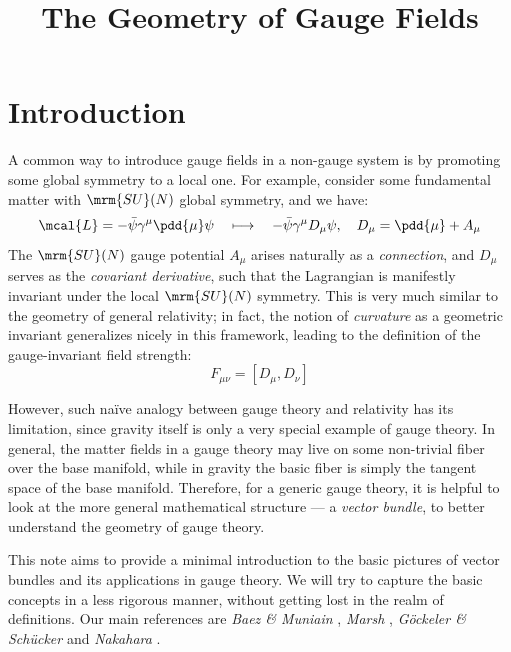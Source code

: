 \documentclass[a4paper,11pt]{article}
\title{The Geometry of Gauge Fields}
\begin{document}
\maketitle
\pagestyle{headings}
\thispagestyle{empty}


\setlength{\parskip}{.1\baselineskip}
\tableofcontents
\setlength{\parskip}{\parskipnorm}

\section{Introduction}
	A common way to introduce gauge fields in a non-gauge system is by promoting some global symmetry to a local one. For example, consider some fundamental matter with $\mrm{SU}(N)$ global symmetry, and we have: 
	\begin{equation}
		\mcal{L}
		= -\bar{\psi} \gamma^\mu \pdd{\mu} \psi
		\quad\longmapsto\quad
			-\bar{\psi} \gamma^\mu D_\mu \psi,
		\quad
			D_\mu = \pdd{\mu} + A_\mu
	\end{equation}
	The $\mrm{SU}(N)$ gauge potential $A_\mu$ arises naturally as a \textit{connection}, and $D_\mu$ serves as the \textit{covariant derivative}, such that the Lagrangian is manifestly invariant under the local $\mrm{SU}(N)$ symmetry. This is very much similar to the geometry of general relativity; in fact, the notion of \textit{curvature} as a geometric invariant generalizes nicely in this framework, leading to the definition of the gauge-invariant field strength:
	\begin{equation}
		F_{\mu\nu} = [D_\mu,D_\nu]
	\end{equation}
	
	However, such na\"ive analogy between gauge theory and relativity has its limitation, since gravity itself is only a very special example of gauge theory. In general, the matter fields in a gauge theory may live on some non-trivial fiber over the base manifold, while in gravity the basic fiber is simply the tangent space of the base manifold. Therefore, for a generic gauge theory, it is helpful to look at the more general mathematical structure — a \textit{vector bundle}, to better understand the geometry of gauge theory. 
	
	This note aims to provide a minimal introduction to the basic pictures of vector bundles and its applications in gauge theory. We will try to capture the basic concepts  in a less rigorous manner, without getting lost in the realm of definitions. Our main references are \textit{Baez \& Muniain} \cite{baez1994gauge}, \textit{Marsh} \cite{Marsh:2016hdj}, \textit{Göckeler \& Schücker} \cite{gockeler1989differential} and \textit{Nakahara} \cite{Nakahara:2003nw}. 
\end{document}
